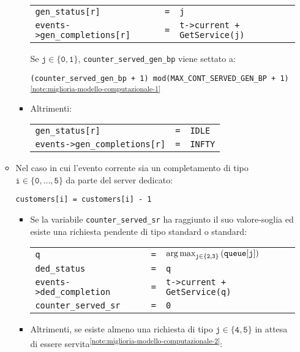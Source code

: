 \begin{enumerate}[label=Step \arabic*), align=left, leftmargin=*]
\begin{itemize}
\begin{itemize}
\begin{center}
\begin{tabular}{l l l}
\texttt{gen\_status[r]} & \texttt{=} & \texttt{j} \\
\texttt{events->gen\_completions[r]} & \texttt{=} & \texttt{t->current + GetService(j)}
\end{tabular}
\end{center}
{\color{purple}Se $\mathtt{j \in \lbrace 0, 1 \rbrace}$, \texttt{counter\_served\_gen\_bp} viene settato a:
\begin{center}
\texttt{(counter\_served\_gen\_bp + 1) mod(MAX\_CONT\_SERVED\_GEN\_BP + 1)}\textsuperscript{\ref{note:miglioria-modello-computazionale-1}}
\end{center}}
\item Altrimenti:
\begin{center}
\begin{tabular}{l l l}
\texttt{gen\_status[r]} & \texttt{=} & \texttt{IDLE} \\
\texttt{events->gen\_completions[r]} & \texttt{=} & \texttt{INFTY}
\end{tabular}
\end{center}
\end{itemize}
\item Nel caso in cui l'evento corrente sia un completamento di tipo $\mathtt{i \in \lbrace 0, \dots, 5 \rbrace}$ da parte del server dedicato:
\begin{center}
\texttt{customers[i] = customers[i] - 1}
\end{center}
\begin{itemize}
\item {\color{purple}Se la variabile \texttt{counter\_served\_sr} ha raggiunto il suo valore-soglia ed esiste una richiesta pendente di tipo \uo{} standard o \pp{} standard:
\begin{center}
\begin{tabular}{l l l}
\texttt{q} & \texttt{=} & $\mathtt{\operatorname*{arg\,max}_{j \in \lbrace 2, 3 \rbrace}{\left(queue[j]\right)}}$ \\
\texttt{ded\_status} & \texttt{=} & \texttt{q} \\
\texttt{events->ded\_completion} & \texttt{=} & \texttt{t->current + GetService(q)} \\
\texttt{counter\_served\_sr} & \texttt{=} & \texttt{0}
\end{tabular}
\end{center}}
\item {\color{purple}Altrimenti,} se esiste almeno una richiesta di tipo $\mathtt{j \in \lbrace 4, 5 \rbrace}$ in attesa di essere servita\textsuperscript{\ref{note:miglioria-modello-computazionale-2}}:

\end{itemize}
\end{itemize}
\end{enumerate}
